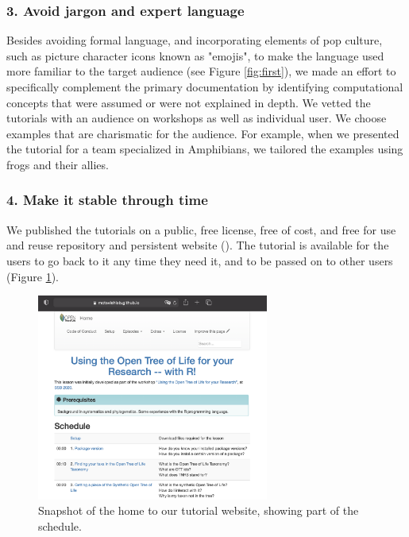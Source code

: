 \documentclass[12pt]{article}
\begin{document}
\subsubsection*{3. Avoid jargon and expert language}

Besides avoiding formal language, and incorporating elements of pop culture, such as picture
character icons known as "emojis", to make the language used more familiar to the
target audience (see Figure \ref{fig:first}), we made an effort to specifically
complement the primary documentation by identifying
computational concepts that were assumed or were not explained in depth.
We vetted the tutorials with an audience on workshops as well as individual user.
We choose examples that are charismatic for the audience.
For example, when we presented the tutorial for a team specialized in Amphibians,
we tailored the examples using frogs and their allies.


\subsubsection*{4. Make it stable through time}

We published the tutorials on a public, free license, free of cost, and free for
use and reuse repository and persistent website (\cite{RopentreeTutorials, RopentreeTutorialsWebsite}).
The tutorial is available for the users to go back to it any time they need it,
and to be passed on to other users (Figure \ref{fig:second}).

\begin{figure}
\begin{center}
\includegraphics[width=3in]{fig2.png}
\end{center}
\caption{Snapshot of the home to our tutorial website, showing part of the schedule. \label{fig:second}}
\end{figure}
\end{document}
